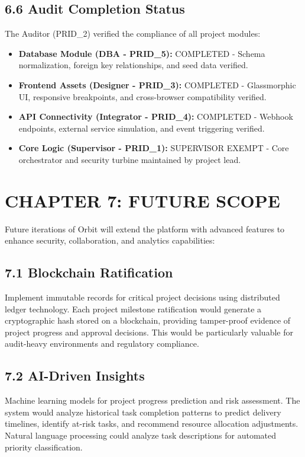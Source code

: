 ﻿\documentclass[12pt]{article}
\def\normaltext{\fontsize{12pt}{18pt}\color{secondary}}
\begin{document}
\subsection*{6.6 Audit Completion Status}
The Auditor (PRID\_2) verified the compliance of all project modules:
\begin{itemize}
\item \textbf{Database Module (DBA - PRID\_5):} COMPLETED - Schema normalization, foreign key relationships, and seed data verified.
\item \textbf{Frontend Assets (Designer - PRID\_3):} COMPLETED - Glassmorphic UI, responsive breakpoints, and cross-browser compatibility verified.
\item \textbf{API Connectivity (Integrator - PRID\_4):} COMPLETED - Webhook endpoints, external service simulation, and event triggering verified.
\item \textbf{Core Logic (Supervisor - PRID\_1):} SUPERVISOR EXEMPT - Core orchestrator and security turbine maintained by project lead.
\end{itemize}
\newpage

\section*{{\color{primary}CHAPTER 7: FUTURE SCOPE}}
\normaltext
Future iterations of Orbit will extend the platform with advanced features to enhance security, collaboration, and analytics capabilities:

\subsection*{7.1 Blockchain Ratification}
Implement immutable records for critical project decisions using distributed ledger technology. Each project milestone ratification would generate a cryptographic hash stored on a blockchain, providing tamper-proof evidence of project progress and approval decisions. This would be particularly valuable for audit-heavy environments and regulatory compliance.

\subsection*{7.2 AI-Driven Insights}
Machine learning models for project progress prediction and risk assessment. The system would analyze historical task completion patterns to predict delivery timelines, identify at-risk tasks, and recommend resource allocation adjustments. Natural language processing could analyze task descriptions for automated priority classification.
\end{document}
